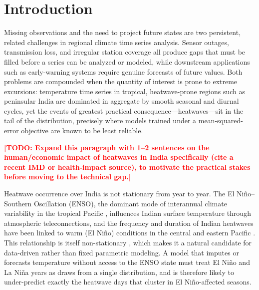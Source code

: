 \documentclass[conference]{IEEEtran}
\newcommand{\TODO}[1]{\textcolor{red}{\textbf{[TODO: #1]}}}
\begin{document}
\section{Introduction}
\label{sec:intro}

Missing observations and the need to project future states are two persistent, related challenges in
regional climate time series analysis. Sensor outages, transmission loss, and irregular station
coverage all produce gaps that must be filled before a series can be analyzed or modeled, while
downstream applications such as early-warning systems require genuine forecasts of future values. Both
problems are compounded when the quantity of interest is prone to extreme excursions: temperature
time series in tropical, heatwave-prone regions such as peninsular India are dominated in aggregate by
smooth seasonal and diurnal cycles, yet the events of greatest practical consequence---heatwaves---sit
in the tail of the distribution, precisely where models trained under a mean-squared-error
objective are known to be least reliable.

\TODO{Expand this paragraph with 1--2 sentences on the human/economic impact of heatwaves in India
specifically (cite a recent IMD or health-impact source), to motivate the practical stakes before
moving to the technical gap.}

Heatwave occurrence over India is not stationary from year to year. The El Ni\~{n}o--Southern
Oscillation (ENSO), the dominant mode of interannual climate variability in the tropical Pacific
\cite{trenberth1997definition,mcphaden2006enso}, influences Indian surface temperature through
atmospheric teleconnections, and the frequency and duration of Indian heatwaves have been linked to
warm (El Ni\~{n}o) conditions in the central and eastern Pacific
\cite{rohini2016variability,ratnam2016anatomy}. This relationship is itself non-stationary
\cite{kumar1999weakening}, which makes it a natural candidate for data-driven rather than fixed
parametric modeling. A model that imputes or forecasts temperature without access to the ENSO state
must treat El Ni\~{n}o and La Ni\~{n}a years as draws from a single distribution, and is therefore
likely to under-predict exactly the heatwave days that cluster in El Ni\~{n}o-affected seasons.
\end{document}
